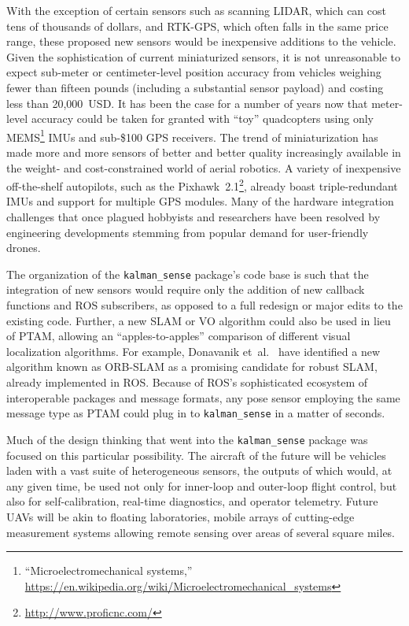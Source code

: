With the exception of certain sensors such as scanning LIDAR, which can cost tens of thousands of dollars, and RTK-GPS, which often falls in the same price range, these proposed new sensors would be inexpensive additions to the vehicle. Given the sophistication of current miniaturized sensors, it is not unreasonable to expect sub-meter or centimeter-level position accuracy from vehicles weighing fewer than fifteen pounds (including a substantial sensor payload) and costing less than 20,000~USD. It has been the case for a number of years now that meter-level accuracy could be taken for granted with ``toy'' quadcopters using only MEMS\footnote{``Microelectromechanical systems,''\\ \url{https://en.wikipedia.org/wiki/Microelectromechanical_systems}} IMUs and sub-\$100 GPS receivers. The trend of miniaturization has made more and more sensors of better and better quality increasingly available in the weight- and cost-constrained world of aerial robotics. A variety of inexpensive off-the-shelf autopilots, such as the Pixhawk~2.1\footnote{\url{http://www.proficnc.com/}}, already boast triple-redundant IMUs and support for multiple GPS modules. Many of the hardware integration challenges that once plagued hobbyists and researchers have been resolved by engineering developments stemming from popular demand for user-friendly drones.

The organization of the \texttt{kalman\_sense} package's code base is such that the integration of new sensors would require only the addition of new callback functions and ROS subscribers, as opposed to a full redesign or major edits to the existing code. Further, a new SLAM or VO algorithm could also be used in lieu of PTAM, allowing an ``apples-to-apples'' comparison of different visual localization algorithms. For example, Donavanik et~al.\ \cite{Donavanik2016} have identified a new algorithm known as ORB-SLAM \cite{Mur-Artal2015} as a promising candidate for robust SLAM, already implemented in ROS. Because of ROS's sophisticated ecosystem of interoperable packages and message formats, any pose sensor employing the same message type as PTAM could plug in to \texttt{kalman\_sense} in a matter of seconds.

Much of the design thinking that went into the \texttt{kalman\_sense} package was focused on this particular possibility. The aircraft of the future will be vehicles laden with a vast suite of heterogeneous sensors, the outputs of which would, at any given time, be used not only for inner-loop and outer-loop flight control, but also for self-calibration, real-time diagnostics, and operator telemetry. Future UAVs will be akin to floating laboratories, mobile arrays of cutting-edge measurement systems allowing remote sensing over areas of several square miles.

